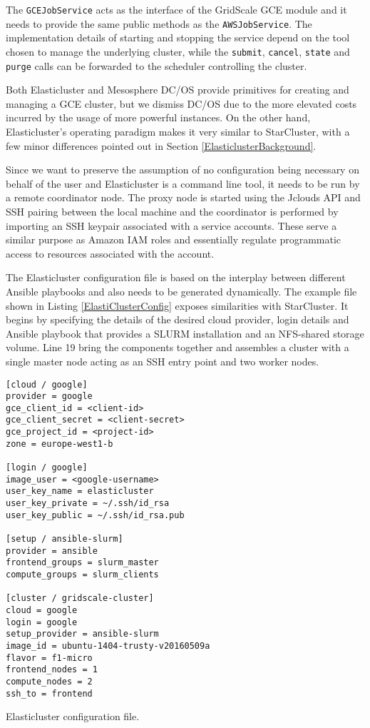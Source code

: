 The \verb|GCEJobService| acts as the interface of the GridScale GCE module and it needs to provide the same public methods as the \verb|AWSJobService|. The implementation details of starting and stopping the service depend on the tool chosen to manage the underlying cluster, while the \verb|submit|, \verb|cancel|, \verb|state| and \verb|purge| calls can be forwarded to the scheduler controlling the cluster.

Both Elasticluster and Mesosphere DC/OS provide primitives for creating and managing a GCE cluster, but we dismiss DC/OS due to the more elevated costs incurred by the usage of more powerful instances. On the other hand, Elasticluster's operating paradigm makes it very similar to StarCluster, with a few minor differences pointed out in Section \ref{ElasticlusterBackground}. 

Since we want to preserve the assumption of no configuration being necessary on behalf of the user and Elasticluster is a command line tool, it needs to be run by a remote coordinator node. The proxy node is started using the Jclouds API and SSH pairing between the local machine and the coordinator is performed by importing an SSH keypair associated with a service accounts. These serve a similar purpose as Amazon IAM roles and essentially regulate programmatic access to resources associated with the account.

The Elasticluster configuration file is based on the interplay between different Ansible playbooks and also needs to be generated dynamically. The example file shown in Listing \ref{ElastiClusterConfig} exposes similarities with StarCluster. It begins by specifying the details of the desired cloud provider, login details and Ansible playbook that provides a SLURM installation and an NFS-shared storage volume. Line 19 bring the components together and assembles a cluster with a single master node acting as an SSH entry point and two worker nodes.

\begin{listing}[h]
	\centering
	\begin{minipage}{8cm}
		\begin{verbatim}
[cloud / google]
provider = google
gce_client_id = <client-id>
gce_client_secret = <client-secret>
gce_project_id = <project-id>
zone = europe-west1-b	

[login / google]
image_user = <google-username>
user_key_name = elasticluster
user_key_private = ~/.ssh/id_rsa
user_key_public = ~/.ssh/id_rsa.pub

[setup / ansible-slurm]
provider = ansible
frontend_groups = slurm_master
compute_groups = slurm_clients

[cluster / gridscale-cluster]
cloud = google
login = google
setup_provider = ansible-slurm
image_id = ubuntu-1404-trusty-v20160509a
flavor = f1-micro
frontend_nodes = 1
compute_nodes = 2
ssh_to = frontend
		\end{verbatim}
	\end{minipage}
	\caption{Elasticluster configuration file.}
	\label{ElastiClusterConfig}
\end{listing}

